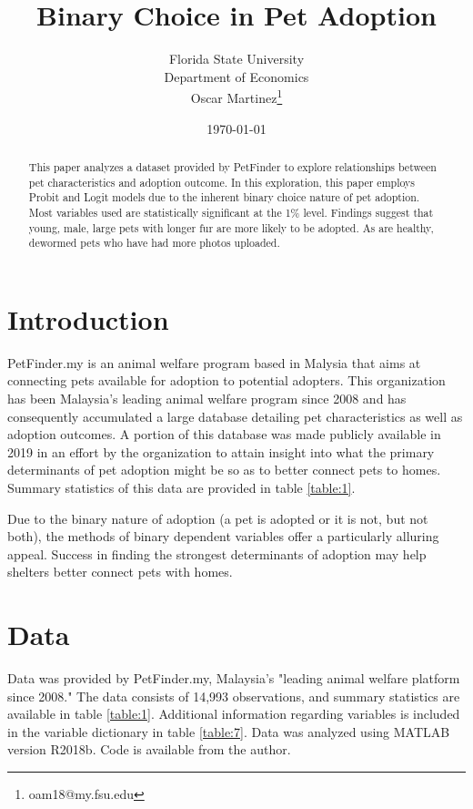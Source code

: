 \documentclass[12pt]{article}
\title{Binary Choice in Pet Adoption}
\author{Florida State University\\ Department of Economics \\ Oscar Martinez\thanks{oam18@my.fsu.edu}}
\date{\today}
\begin{document}
\maketitle

\begin{abstract}
	This paper analyzes a dataset provided by PetFinder to explore relationships between pet characteristics and adoption outcome. In this exploration, this paper employs Probit and Logit models due to the inherent binary choice nature of pet adoption. Most variables used are statistically significant at the 1\% level. Findings suggest that young, male, large pets with longer fur are more likely to be adopted. As are healthy, dewormed pets who have had more photos uploaded. 
\end{abstract}

\newpage
		
		
	\section{Introduction}
		PetFinder.my is an animal welfare program based in Malysia that aims at connecting pets available for adoption to potential adopters. This organization has been Malaysia's leading animal welfare program since 2008 and has consequently accumulated a large database detailing pet characteristics as well as adoption outcomes. A portion of this database was made publicly available in 2019 in an effort by the organization to attain insight into what the primary determinants of pet adoption might be so as to better connect pets to homes. Summary statistics of this data are provided in table \ref{table:1}.
		
		Due to the binary nature of adoption (a pet is adopted or it is not, but not both), the methods of binary dependent variables offer a particularly alluring appeal. Success in finding the strongest determinants of adoption may help shelters better connect pets with homes.
		
		\section{Data}
		Data was provided by PetFinder.my, Malaysia's "leading animal welfare platform since 2008." The data consists of 14,993 observations, and summary statistics are available in table \ref{table:1}. Additional information regarding variables is included in the variable dictionary in table \ref{table:7}. Data was analyzed using MATLAB version R2018b. Code is available from the author. 
		
\end{document}
